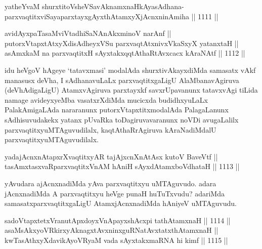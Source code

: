 
\begin{shl}
yatheYvaM shurxtitoV\s sheVSavAknamxnaHkAyasAdhana-\\
parxvaqtitxviSayaparxtayxgAyxthAtamxyXjAcnxninAmiha \hfill || 1111 ||  
\end{shl}
				
\begin{shl}
avidAyxpaTasaMviVtadhiSaNAnAkxminoV narAnf ||  \\
putorxVtapxtAtxyXdisAdheyxVSu parxvaqtAtxnivxVkaSxyX yatanxtaH || \\
asAmxkaM na parxvaqtitxH sAyxtakxqqtAthaRtAvxcacx kAraNAtf \hfill || 1112 ||  
\end{shl}

\begin{artha}
idu heVgoV hAgeye `tatavxmasi' modalAda shurxtivAkayxdiMda samasatx vAkf manasusx deVha, I sAdhanavuLaLx parxvaqtitxgaLigU  AlaMbanavAgiruva (deVhAdigaLigU) AtamxvAgiruva parxtayxkf savxrUpavanunx tatavxvAgi tiLida namage avideyxyeMba vasatxrXdiMda mucicxda budidhxyuLaLx PalakAmigaLAda nararanunx putorxVtapxtitxmodalAda PalagaLanunx sAdhisuvudakekx yatanx pUvaRka toDagiruvavaranunx noVDi avugaLalilx parxvaqtitxyuMTAguvudilalx, kaqtAthaRrAgiruva kAraNadiMdalU parxvaqtitxyuMTAguvudilalx.
\end{artha}

\begin{shl}
yadajAcnxnAtapxrXvaqtitxyAR tajAjxcnXnAtAsx kutoV BaveVtf || \\
tasAmxtasxvaRparxvaqtitxVnAM hAniH sAyxdAtamxboVdhataH \hfill || 1113 ||  
\end{shl}

\begin{artha}
yAvudara ajAcnxnadiMda yAva parxvaqtitxyu uMTAguvudo. adara jAcnxnadiMda A parxvaqtitxyu heVge punaH huTuTxvudu? adariMda samasatxparxvaqtitxgaLigU AtamxjAcnxnadiMda hAniyeV uMTAguvudu.
\end{artha}

\begin{shl}
sadoVtapxtetxVranutApxdoyxV\s nApayxshAcxpi tathA\s \s tamxnaH \hfill || 1114 ||  \\
asaMsAkxyoVR\s kirxyAknagxtAvxninxguRNatAvxtatxthA\s \s tamxnaH || \\
kwTasAthxyXdavikAyoVR\s yaM vada sAyxtakxmaRNA hi kimf \hfill || 1115 ||  
\end{shl}

